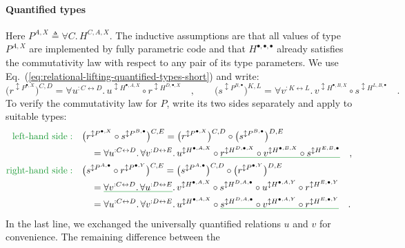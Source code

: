\paragraph{Quantified types}

Here $P^{A,X}\triangleq\forall C.\,H^{C,A,X}$. The inductive assumptions
are that all values of type $P^{A,X}$ are implemented by fully parametric
code and that $H^{\bullet,\bullet,\bullet}$ already satisfies the
commutativity law with respect to any pair of its type parameters.
We use Eq.~(\ref{eq:relational-lifting-quantified-types-short})
and write:
\[
\big(r^{\updownarrow P^{\bullet,X}}\big)^{C,D}=\forall u^{:C\leftrightarrow D}.\,u^{\updownarrow H^{\bullet,A,X}}\circ r^{\updownarrow H^{D,\bullet,X}}\quad,\quad\quad\big(s^{\updownarrow P^{B,\bullet}}\big)^{K,L}=\forall v^{:K\leftrightarrow L}.\,v^{\updownarrow H^{\bullet,B,X}}\circ s^{\updownarrow H^{L,B,\bullet}}\quad.
\]
To verify the commutativity law for $P$, write its two sides separately
and apply to suitable types:
\begin{align*}
{\color{greenunder}\text{left-hand side}:}\quad & \big(r^{\updownarrow P^{\bullet,X}}\circ s^{\updownarrow P^{B,\bullet}}\big)^{C,E}=\big(r^{\updownarrow P^{\bullet,X}}\big)^{C,D}\circ\big(s^{\updownarrow P^{B,\bullet}}\big)^{D,E}\\
 & \quad=\forall u^{:C\leftrightarrow D}.\,\forall v^{:D\leftrightarrow E}.\,u^{\updownarrow H^{\bullet,A,X}}\circ\gunderline{r^{\updownarrow H^{D,\bullet,X}}\circ v^{\updownarrow H^{\bullet,B,X}}\circ s^{\updownarrow H^{E,B,\bullet}}}\quad,\\
{\color{greenunder}\text{right-hand side}:}\quad & \big(s^{\updownarrow P^{A,\bullet}}\circ r^{\updownarrow P^{\bullet,Y}}\big)^{C,E}=\big(s^{\updownarrow P^{A,\bullet}}\big)^{C,D}\circ\big(r^{\updownarrow P^{\bullet,Y}}\big)^{D,E}\\
 & \quad=\gunderline{\forall v^{:C\leftrightarrow D}.\,\forall u^{:D\leftrightarrow E}}.\,v^{\updownarrow H^{\bullet,A,X}}\circ s^{\updownarrow H^{D,A,\bullet}}\circ u^{\updownarrow H^{\bullet,A,Y}}\circ r^{\updownarrow H^{E,\bullet,Y}}\\
 & \quad=\forall u^{:C\leftrightarrow D}.\,\forall v^{:D\leftrightarrow E}.\,u^{\updownarrow H^{\bullet,A,X}}\circ\gunderline{s^{\updownarrow H^{D,A,\bullet}}\circ v^{\updownarrow H^{\bullet,A,Y}}\circ r^{\updownarrow H^{E,\bullet,Y}}}\quad.
\end{align*}
In the last line, we exchanged the universally quantified relations
$u$ and $v$ for convenience. The remaining difference between the
